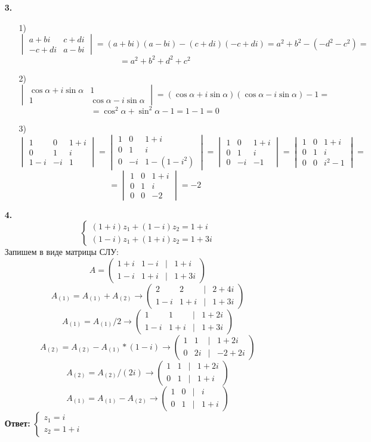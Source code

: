 \documentclass[a4paper]{article}
\newcommand{\mat}[1]{\begin{pmatrix} #1 \end{pmatrix}}
\renewcommand{\det}[1]{\begin{vmatrix} #1 \end{vmatrix}}
\newcommand{\case}[1]{\begin{cases} #1 \end{cases}}
\begin{document}
\begin{enumerate}
    \item[\textbf{3.}]
    \begin{enumerate}
        \item[1)]$$\det{a + bi & c + di \\ -c +di & a-bi} = (a + bi)(a-bi) - (c + di)(-c +di) = a^2 + b^2 - (-d^2-c^2) = $$
        $$ = a^2 + b^2 +d^2+c^2$$
        \item[2)]$$\det{\cos \alpha + i \sin \alpha & 1 \\ 1 & \cos \alpha - i \sin \alpha} = (\cos \alpha + i \sin \alpha)(\cos \alpha - i \sin \alpha) - 1 = $$
        $$=\cos^2 \alpha + \sin^2 \alpha - 1 = 1- 1 = 0$$
        \item[3)]$$\det{1 & 0 & 1 + i \\ 0 & 1 & i \\ 1-i & -i & 1} = \det{1 & 0 & 1 + i \\ 0 & 1 & i \\ 0 & -i & 1-(1-i^2)} = \det{1 & 0 & 1 + i \\ 0 & 1 & i \\ 0 & -i & -1}= \det{1 & 0 & 1 + i \\ 0 & 1 & i \\ 0 & 0 & i^2-1} =$$
        $$=\det{1 & 0 & 1 + i \\ 0 & 1 & i \\ 0 & 0 & -2} = -2$$
    \end{enumerate}

    \item[\textbf{4.}]
    $$\case{
        (1+i)z_1 + (1-i)z_2 = 1 + i \\
        (1-i)z_1 + (1+i)z_2 = 1 + 3i
    }$$
    Запишем в виде матрицы СЛУ:
    $$A = \mat{1+i & 1-i &| &1 + i \\ 1-i & 1+i & | & 1 + 3i} $$
    $$A_{(1)} = A_{(1)} + A_{(2)} \to \mat{2 & 2 &| & 2+4i \\ 1-i & 1+i & | & 1 + 3i}$$
    $$A_{(1)} = A_{(1)}/2 \to \mat{1 & 1 &| & 1+2i \\ 1-i & 1+i & | & 1 + 3i}$$
    $$A_{(2)} = A_{(2)}-A_{(1)}*(1-i) \to \mat{1 & 1 &| & 1+2i \\ 0 & 2i & | & -2 + 2i}$$
    $$A_{(2)} = A_{(2)}/(2i) \to \mat{1 & 1 &| & 1+2i \\ 0 & 1 & | & 1+i}$$
    $$A_{(1)} = A_{(1)}-A_{(2)} \to \mat{1 & 0 &| & i \\ 0 & 1 & | & 1+i}$$
    \textbf{Ответ: } $\case{z_1 = i \\ z_2 = 1+i}$\\


\end{enumerate}
\end{document}

